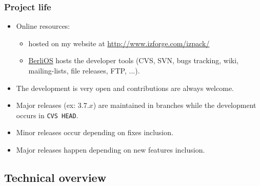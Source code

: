 \documentclass[compress,10pt]{beamer}
\begin{document}

\begin{frame}

\frametitle{Project life}

\begin{itemize}

  \item Online resources:
    \begin{itemize}
      \item hosted on my website at
      \href{http://www.izforge.com/izpack/}{\url{http://www.izforge.com/izpack/}}

      \item \href{http://www.berlios.de/}{BerliOS} hosts the developer tools
      (CVS, SVN, bugs tracking, wiki, mailing-lists, file releases, FTP, ...).
    \end{itemize}

    \item The development is very open and contributions are always welcome.

    \item Major releases (ex: $3.7.x$) are maintained in branches while the
    development occurs in \texttt{CVS HEAD}.

    \item Minor releases occur depending on fixes inclusion.

    \item Major releases happen depending on new features inclusion.

\end{itemize}

\end{frame}


\subsection{Technical overview}
\end{document}
